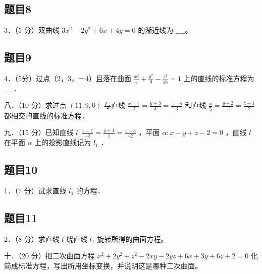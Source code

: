 \documentclass{article}
\begin{document}
\subsection{题目8}
3．（5 分）双曲线 \(3 x^{2}-2 y^{2}+6 x+4 y=0\) 的渐近线为 \(\_\_\_\_\)。\\

\subsection{题目9}
4．（5分）过点（2，3，－4）且落在曲面 \(\frac{x^{2}}{4}+\frac{y^{2}}{9}-\frac{z^{2}}{16}=1\) 上的直线的标准方程为 \(\_\_\_\_\)．

八．（10 分）求过点 \((11,9,0)\) 与直线 \(\frac{x-1}{2}=\frac{y+3}{4}=\frac{z-5}{3}\) 和直线 \(\frac{x}{5}=\frac{y-2}{-1}=\frac{z+1}{2}\) 都相交的直线的标准方程．

九．（15 分）已知直线 \(l: \frac{x-1}{-3}=\frac{y+1}{1}=\frac{z-3}{-2}\) ，平面 \(\alpha: x-y+z-2=0\) ，直线 \(l\) 在平面 \(\alpha\) 上的投影直线记为 \(l_{1}\) ．\\

\subsection{题目10}
1．（7 分）试求直线 \(l_{1}\) 的方程．\\

\subsection{题目11}
2．（8 分）求直线 \(l\) 绕直线 \(l_{1}\) 旋转所得的曲面方程。

十．（20 分）把二次曲面方程 \(x^{2}+2 y^{2}+z^{2}-2 x y-2 y z+6 x+3 y+6 z+2=0\) 化简成标准方程，写出所用坐标变换，并说明这是哪种二次曲面。
\end{document}
